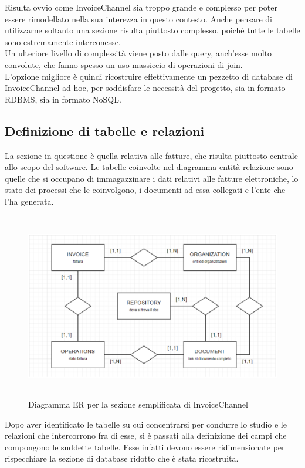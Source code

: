 \noindent Risulta ovvio come InvoiceChannel sia troppo grande e complesso per poter essere rimodellato nella sua interezza in questo contesto. Anche pensare di utilizzarne soltanto una sezione risulta piuttosto complesso, poichè tutte le tabelle sono estremamente interconesse.\\
Un ulteriore livello di complessità viene posto dalle query, anch'esse molto convolute, che fanno spesso un uso massiccio di operazioni di join.\\
L'opzione migliore è quindi ricostruire effettivamente un pezzetto di database di InvoiceChannel ad-hoc, per soddisfare le necessità del progetto, sia in formato RDBMS, sia in formato NoSQL.\\

\subsection{Definizione di tabelle e relazioni}
La sezione in questione è quella relativa alle fatture, che risulta piuttosto centrale allo scopo del software. Le tabelle coinvolte nel diagramma entità-relazione sono quelle che si occupano di immagazzinare i dati relativi alle fatture elettroniche, lo stato dei processi che le coinvolgono, i documenti ad essa collegati e l'ente che l'ha generata.\\

\begin{figure}[htbp]
\begin{center}
\includegraphics[height=22em]{immagini/ER-Mock-IC.png}
\caption{Diagramma ER per la sezione semplificata di InvoiceChannel}
\end{center}
\end{figure}

\noindent Dopo aver identificato le tabelle su cui concentrarsi per condurre lo studio e le relazioni che intercorrono fra di esse, si è passati alla definizione dei campi che compongono le suddette tabelle. Esse infatti devono essere ridimensionate per rispecchiare la sezione di database ridotto che è stata ricostruita.\\

